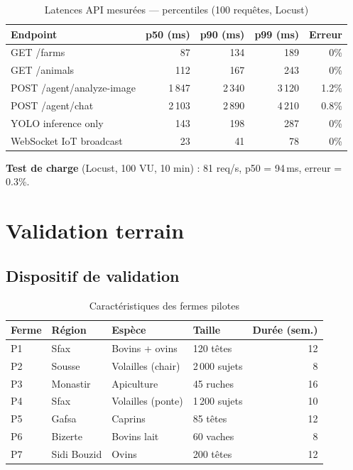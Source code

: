 \begin{table}[H]
\centering
\caption{Latences API mesurées — percentiles (100 requêtes, Locust)}
\label{tab:latences}
\begin{tabular}{lrrrr}
\toprule
\textbf{Endpoint} & \textbf{p50 (ms)} & \textbf{p90 (ms)} & \textbf{p99 (ms)} & \textbf{Erreur} \\
\midrule
GET /farms               & 87  & 134 & 189 & 0\% \\
GET /animals             & 112 & 167 & 243 & 0\% \\
POST /agent/analyze-image& 1\,847 & 2\,340 & 3\,120 & 1.2\% \\
POST /agent/chat         & 2\,103 & 2\,890 & 4\,210 & 0.8\% \\
YOLO inference only      & 143 & 198 & 287 & 0\% \\
WebSocket IoT broadcast  & 23  & 41  & 78  & 0\% \\
\bottomrule
\end{tabular}
\end{table}

\textbf{Test de charge} (Locust, 100 VU, 10 min) : 81 req/s, p50 = 94\,ms, erreur = 0.3\%.

\section{Validation terrain}

\subsection{Dispositif de validation}

\begin{table}[H]
\centering
\caption{Caractéristiques des fermes pilotes}
\label{tab:fermes_pilotes}
\begin{tabular}{llllr}
\toprule
\textbf{Ferme} & \textbf{Région} & \textbf{Espèce} & \textbf{Taille} & \textbf{Durée (sem.)} \\
\midrule
P1 & Sfax    & Bovins + ovins  & 120 têtes  & 12 \\
P2 & Sousse  & Volailles (chair)& 2\,000 sujets & 8 \\
P3 & Monastir& Apiculture      & 45 ruches  & 16 \\
P4 & Sfax    & Volailles (ponte)& 1\,200 sujets & 10 \\
P5 & Gafsa   & Caprins         & 85 têtes   & 12 \\
P6 & Bizerte & Bovins lait     & 60 vaches  & 8 \\
P7 & Sidi Bouzid & Ovins      & 200 têtes  & 12 \\
\bottomrule
\end{tabular}
\end{table}

